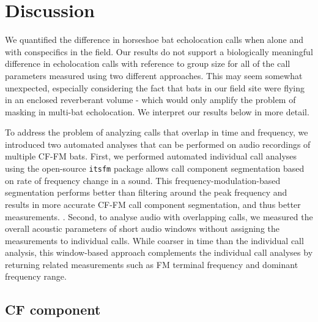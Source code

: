 \documentclass[
]{book}
\begin{document}
\hypertarget{discussion-1}{%
\section{Discussion}\label{discussion-1}}

We quantified the difference in horseshoe bat echolocation calls when alone and with conspecifics in the field. Our results do not support a biologically meaningful difference in echolocation calls with reference to group size for all of the call parameters measured using two different approaches. This may seem somewhat unexpected, especially considering the fact that bats in our field site were flying in an enclosed reverberant volume - which would only amplify the problem of masking in multi-bat echolocation. We interpret our results below in more detail.

To address the problem of analyzing calls that overlap in time and frequency, we introduced two automated analyses that can be performed on audio recordings of multiple CF-FM bats. First, we performed automated individual call analyses using the open-source \texttt{itsfm} package allows call component segmentation based on rate of frequency change in a sound. This frequency-modulation-based segmentation performs better than filtering around the peak frequency and results in more accurate CF-FM call component segmentation, and thus better measurements. \citep{itsfmcitation}. Second, to analyse audio with overlapping calls, we measured the overall acoustic parameters of short audio windows without assigning the measurements to individual calls. While coarser in time than the individual call analysis, this window-based approach complements the individual call analyses by returning related measurements such as FM terminal frequency and dominant frequency range.

\hypertarget{cf-component}{%
\subsection{CF component}\label{cf-component}}
\end{document}
